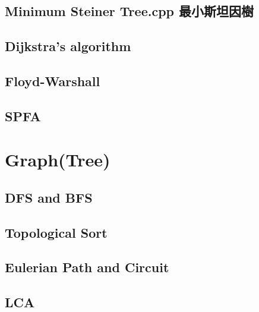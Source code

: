\subsection{Minimum Steiner Tree.cpp 最小斯坦因樹}


\subsection{Dijkstra’s algorithm}


\subsection{Floyd-Warshall}


%

\subsection{SPFA}


\section{Graph(Tree)}

\subsection{DFS and BFS}


\subsection{Topological Sort}


\subsection{Eulerian Path and Circuit}


\subsection{LCA}


